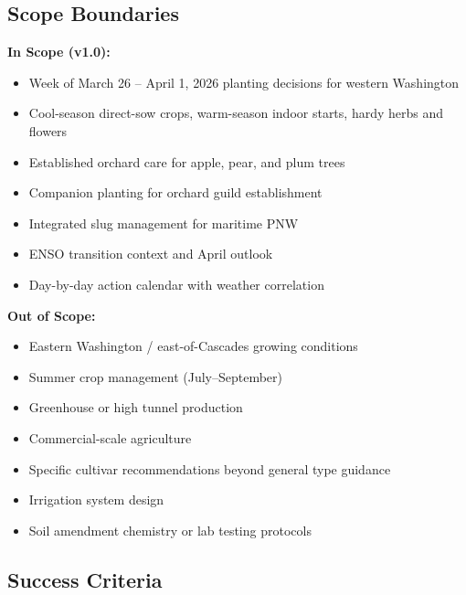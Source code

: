 \documentclass[11pt,letterpaper]{article}
\begin{document}
\subsection{Scope Boundaries}

\textbf{In Scope (v1.0):}
\begin{itemize}[leftmargin=*]
\item Week of March 26 -- April 1, 2026 planting decisions for western Washington
\item Cool-season direct-sow crops, warm-season indoor starts, hardy herbs and flowers
\item Established orchard care for apple, pear, and plum trees
\item Companion planting for orchard guild establishment
\item Integrated slug management for maritime PNW
\item ENSO transition context and April outlook
\item Day-by-day action calendar with weather correlation
\end{itemize}

\textbf{Out of Scope:}
\begin{itemize}[leftmargin=*]
\item Eastern Washington / east-of-Cascades growing conditions
\item Summer crop management (July--September)
\item Greenhouse or high tunnel production
\item Commercial-scale agriculture
\item Specific cultivar recommendations beyond general type guidance
\item Irrigation system design
\item Soil amendment chemistry or lab testing protocols
\end{itemize}

\subsection{Success Criteria}
\end{document}
